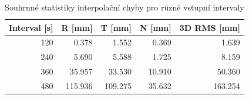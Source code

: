 \begin{table}[H]
\centering
\small
\caption{Souhrnné statistiky interpolační chyby pro různé vstupní intervaly}
\label{tab:interp_accuracy}
\begin{tabular}{rrrrr}
\toprule
Interval [s] & R [mm] & T [mm] & N [mm] & 3D RMS [mm] \\
\midrule
120 & 0.378 & 1.552 & 0.369 & 1.639 \\
240 & 5.690 & 5.588 & 1.725 & 8.159 \\
360 & 35.957 & 33.530 & 10.910 & 50.360 \\
480 & 115.936 & 109.275 & 35.632 & 163.254 \\
\bottomrule
\end{tabular}
\end{table}

